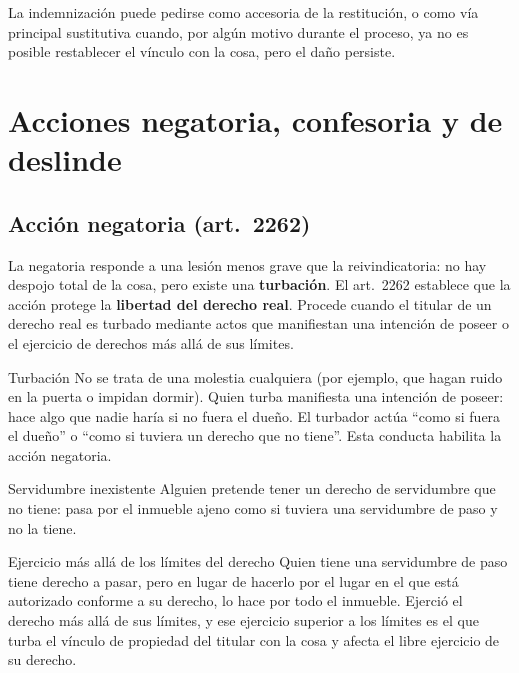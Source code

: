 \documentclass[12pt,oneside]{book}
\begin{document}
\begin{important}
La indemnización puede pedirse como accesoria de la restitución, o como vía principal sustitutiva cuando, por algún motivo durante el proceso, ya no es posible restablecer el vínculo con la cosa, pero el daño persiste.
\end{important}

\section{Acciones negatoria, confesoria y de deslinde}

\subsection{Acción negatoria (art.~2262)}

La negatoria responde a una lesión menos grave que la reivindicatoria: no hay despojo total de la cosa, pero existe una \textbf{turbación}. El art.~2262 establece que la acción protege la \textbf{libertad del derecho real}. Procede cuando el titular de un derecho real es turbado mediante actos que manifiestan una intención de poseer o el ejercicio de derechos más allá de sus límites.

\begin{definition}{Turbación}
No se trata de una molestia cualquiera (por ejemplo, que hagan ruido en la puerta o impidan dormir). Quien turba manifiesta una intención de poseer: hace algo que nadie haría si no fuera el dueño. El turbador actúa ``como si fuera el dueño'' o ``como si tuviera un derecho que no tiene''. Esta conducta habilita la acción negatoria.
\end{definition}

\begin{example}{Servidumbre inexistente}
Alguien pretende tener un derecho de servidumbre que no tiene: pasa por el inmueble ajeno como si tuviera una servidumbre de paso y no la tiene.
\end{example}

\begin{example}{Ejercicio más allá de los límites del derecho}
Quien tiene una servidumbre de paso tiene derecho a pasar, pero en lugar de hacerlo por el lugar en el que está autorizado conforme a su derecho, lo hace por todo el inmueble. Ejerció el derecho más allá de sus límites, y ese ejercicio superior a los límites es el que turba el vínculo de propiedad del titular con la cosa y afecta el libre ejercicio de su derecho.
\end{example}
\end{document}
